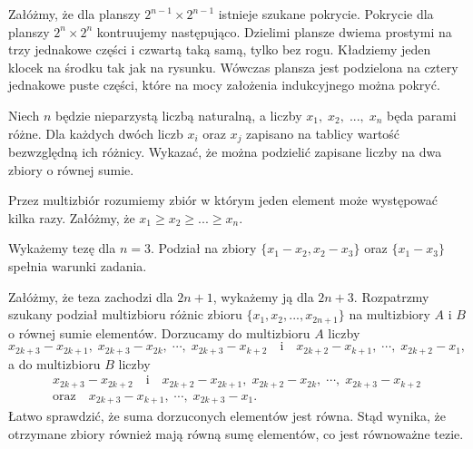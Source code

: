 \noindent
Załóżmy, że dla planszy $2^{n - 1} \times 2^{n - 1}$ istnieje szukane pokrycie. Pokrycie dla planszy $2^{n} \times 2^{n}$ kontruujemy następująco. Dzielimi plansze dwiema prostymi na trzy jednakowe części i czwartą taką samą, tylko bez rogu. Kładziemy jeden klocek na środku tak jak na rysunku. Wówczas plansza jest podzielona na cztery jednakowe puste części, które na mocy założenia indukcyjnego można pokryć.

\begin{problem}{7}
Niech $n$ będzie nieparzystą liczbą naturalną, a liczby $x_1,\; x_2,\; ...,\; x_n$ będa parami różne. Dla każdych dwóch liczb $x_i$ oraz $x_j$ zapisano na tablicy wartość bezwzględną ich różnicy. Wykazać, że można podzielić zapisane liczby na dwa zbiory o równej sumie.
\end{problem}
\noindent
Przez multizbiór rozumiemy zbiór w którym jeden element może występować kilka razy.
Załóżmy, że $x_1 \geqslant x_2 \geqslant ... \geqslant x_n$. 
\vspace{10px}

\noindent
Wykażemy tezę dla $n = 3$. Podział na zbiory $\{x_1 - x_2, x_2 - x_3\}$ oraz $\{x_1 - x_3\}$ spełnia warunki zadania.
\vspace{10px}

\noindent
Załóżmy, że teza zachodzi dla $2n + 1$, wykażemy ją dla $2n + 3$.
Rozpatrzmy szukany podział multizbioru różnic zbioru $\{x_1, x_2, ..., x_{2n + 1}\}$ na multizbiory $A$ i $B$ o równej sumie elementów.
Dorzucamy do multizbioru $A$ liczby
\[
	{x_{2k+3}-x_{2k+1}, \; x_{2k+3}-x_{2k},\; \cdots, \; x_{2k+3}-x_{k+2}} \quad \text{i} \quad {x_{2k+2}-x_{k+1},\; \cdots, \; x_{2k+2}-x_1},
\]
a do multizbioru $B$ liczby
\begin{gather*}
	x_{2k+3} - x_{2k+2} \quad \text{i} \quad x_{2k+2} - x_{2k+1},\; x_{2k+2} - x_{2k},\; \cdots,\; x_{2k+3} - x_{k+2}  \\ \text{oraz} \quad {x_{2k+3} - x_{k+1},\; \cdots, \; x_{2k+3}-x_1}.
\end{gather*}
Łatwo sprawdzić, że suma dorzuconych elementów jest równa. Stąd wynika, że otrzymane zbiory również mają równą sumę elementów, co jest równoważne tezie.